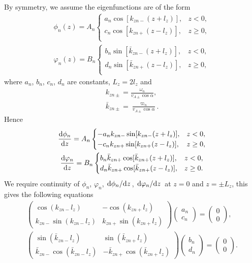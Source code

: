 By symmetry, we assume the eigenfunctions are of the form
\begin{gather}
\phi_n(z)=A_n\begin{cases}
a_n\cos[k_{zn-} (z+l_z)], & z < 0, \\
c_n\cos[k_{zn+} (z-l_z)], & z \ge 0, \\
\end{cases} \\
\varphi_n(z)=B_n\begin{cases}
b_n\sin[\bar{k}_{zn-} (z+l_z)], & z < 0, \\
d_n\sin[\bar{k}_{zn+} (z-l_z)], & z \ge 0, \\
\end{cases}
\end{gather}
where $a_n$, $b_n$, $c_n$, $d_n$ are constants, $L_z = 2l_z$ and
\begin{gather}
    k_{zn\pm} = \frac{\omega_n}{v_{A\pm}\cos\alpha}, \\
    \bar{k}_{zn\pm} = \frac{\varpi_n}{v_{A\pm}\cos\alpha}.
\end{gather}
Hence
\begin{gather}
    \dv{\phi_n}{z}=A_n\begin{cases}
    -a_nk_{zn-}\sin[k_{zn-} (z+l_z)], & z < 0, \\
    -c_nk_{zn+}\sin[k_{zn+} (z-l_z)], & z \ge 0, \\
    \end{cases} \\
    \dv{\varphi_n}{z}=B_n\begin{cases}
    b_n\bar{k}_{zn+}\cos[\bar{k}_{zn+} (z+l_z)], & z < 0, \\
    d_n\bar{k}_{zn+}\cos[\bar{k}_{zn+} (z-l_z)], & z \ge 0. \\
    \end{cases}
\end{gather}
We require continuity of $\phi_n$, $\varphi_n$, $\dv*{\phi_n}{z}$, $\dv*{\varphi_n}{z}$ at $z=0$ and $z=\pm L_z$, this gives the following equations
\begin{gather}
\begin{pmatrix}
\cos(k_{zn-}l_z) & -\cos(k_{zn+}l_z) \\
k_{zn-}\sin(k_{zn-}l_z) & k_{zn+}\sin(k_{zn+}l_z)
\end{pmatrix}
\begin{pmatrix}
a_n \\
c_n
\end{pmatrix}
=
\begin{pmatrix}
0 \\
0
\end{pmatrix}, \\
\begin{pmatrix}
\sin(\bar{k}_{zn-}l_z) & \sin(\bar{k}_{zn+}l_z) \\
\bar{k}_{zn-}\cos(\bar{k}_{zn-}l_z) & -\bar{k}_{zn+}\cos(\bar{k}_{zn+}l_z)
\end{pmatrix}
\begin{pmatrix}
b_n \\
d_n
\end{pmatrix}
=
\begin{pmatrix}
0 \\
0
\end{pmatrix}.
\end{gather}
